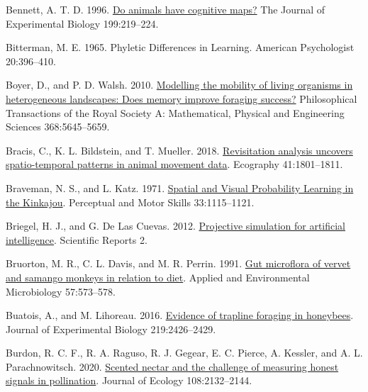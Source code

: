 \documentclass[twoside,12pt,final]{ucthesis-CA2012}
\newenvironment{CSLReferences}%
  {}%
  {\par}
\begin{document}
\begin{ucmainmatter}
\begin{CSLReferences}{1}{0}
\leavevmode{}%
Bennett, A. T. D. 1996. \href{https://doi.org/10.1.1.318.4634}{Do animals have cognitive maps?} The Journal of Experimental Biology 199:219--224.

\leavevmode{}%
Bitterman, M. E. 1965. Phyletic Differences in Learning. American Psychologist 20:396--410.

\leavevmode{}%
Boyer, D., and P. D. Walsh. 2010. \href{https://doi.org/10.1098/rsta.2010.0275}{Modelling the mobility of living organisms in heterogeneous landscapes: Does memory improve foraging success?} Philosophical Transactions of the Royal Society A: Mathematical, Physical and Engineering Sciences 368:5645--5659.

\leavevmode{}%
Bracis, C., K. L. Bildstein, and T. Mueller. 2018. \href{https://doi.org/10.1111/ecog.03618}{Revisitation analysis uncovers spatio-temporal patterns in animal movement data}. Ecography 41:1801--1811.

\leavevmode{}%
Braveman, N. S., and L. Katz. 1971. \href{https://doi.org/10.2466/pms.1971.33.3f.1115}{Spatial and Visual Probability Learning in the Kinkajou}. Perceptual and Motor Skills 33:1115--1121.

\leavevmode{}%
Briegel, H. J., and G. De Las Cuevas. 2012. \href{https://doi.org/10.1038/srep00400}{Projective simulation for artificial intelligence}. Scientific Reports 2.

\leavevmode{}%
Bruorton, M. R., C. L. Davis, and M. R. Perrin. 1991. \href{https://doi.org/10.1128/aem.57.2.573-578.1991}{Gut microflora of vervet and samango monkeys in relation to diet}. Applied and Environmental Microbiology 57:573--578.

\leavevmode{}%
Buatois, A., and M. Lihoreau. 2016. \href{https://doi.org/10.1242/jeb.143214}{Evidence of trapline foraging in honeybees}. Journal of Experimental Biology 219:2426--2429.

\leavevmode{}%
Burdon, R. C. F., R. A. Raguso, R. J. Gegear, E. C. Pierce, A. Kessler, and A. L. Parachnowitsch. 2020. \href{https://doi.org/10.1111/1365-2745.13432}{Scented nectar and the challenge of measuring honest signals in pollination}. Journal of Ecology 108:2132--2144.


\end{CSLReferences}
\end{ucmainmatter}
\end{document}
